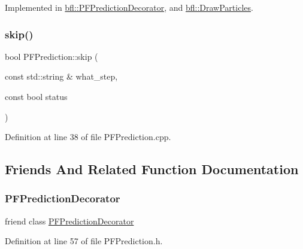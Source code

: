 Implemented in \mbox{\hyperlink{classbfl_1_1PFPredictionDecorator_ad269dfbdecf19d67717a8bc44f0bd286}{bfl\+::\+P\+F\+Prediction\+Decorator}}, and \mbox{\hyperlink{classbfl_1_1DrawParticles_acb607ab90c22a43a72a75576acb898a4}{bfl\+::\+Draw\+Particles}}.

\mbox{\label{classbfl_1_1PFPrediction_a364cc35a151e5298c4024d681f3e04d9}} 
\subsubsection{\texorpdfstring{skip()}{skip()}}
{\footnotesize\ttfamily bool P\+F\+Prediction\+::skip (\begin{DoxyParamCaption}\item[{const std\+::string \&}]{what\+\_\+step,  }\item[{const bool}]{status }\end{DoxyParamCaption})}



Definition at line 38 of file P\+F\+Prediction.\+cpp.



\subsection{Friends And Related Function Documentation}
\mbox{\label{classbfl_1_1PFPrediction_af2aa9540d676f442bcce073daa9974dd}} 
\subsubsection{\texorpdfstring{P\+F\+Prediction\+Decorator}{PFPredictionDecorator}}
{\footnotesize\ttfamily friend class \mbox{\hyperlink{classbfl_1_1PFPredictionDecorator}{P\+F\+Prediction\+Decorator}}\hspace{0.3cm}{\ttfamily [friend]}}



Definition at line 57 of file P\+F\+Prediction.\+h.




